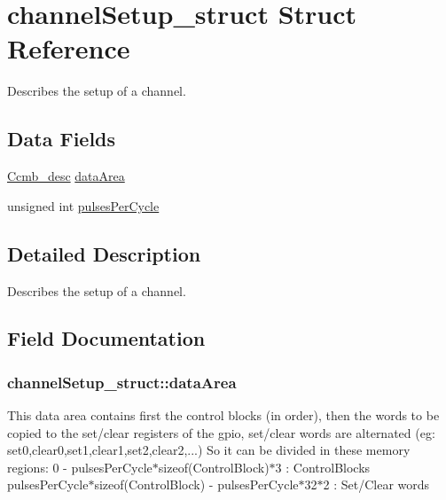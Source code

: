 \hypertarget{structchannelSetup__struct}{}\section{channel\+Setup\+\_\+struct Struct Reference}
\label{structchannelSetup__struct}


Describes the setup of a channel.  


\subsection*{Data Fields}
\begin{DoxyCompactItemize}
\item 
\hyperlink{cacheCoherentMemoryProvider_8h_a05057d32e6fd59ce23d78f2f88d68da2}{Ccmb\+\_\+desc} \hyperlink{structchannelSetup__struct_a07e1a7099e0c476f21dbea53574e1f52}{data\+Area}
\item 
unsigned int \hyperlink{structchannelSetup__struct_a20356f808e59b5e3a0678493fb71ddef}{pulses\+Per\+Cycle}
\end{DoxyCompactItemize}


\subsection{Detailed Description}
Describes the setup of a channel. 

\subsection{Field Documentation}
\subsubsection[{\texorpdfstring{data\+Area}{dataArea}}]{ channel\+Setup\+\_\+struct\+::data\+Area}\hypertarget{structchannelSetup__struct_a07e1a7099e0c476f21dbea53574e1f52}{}\label{structchannelSetup__struct_a07e1a7099e0c476f21dbea53574e1f52}
This data area contains first the control blocks (in order), then the words to be copied to the set/clear registers of the gpio, set/clear words are alternated (eg\+: set0,clear0,set1,clear1,set2,clear2,...) So it can be divided in these memory regions\+: 0 -\/ pulses\+Per\+Cycle$\ast$sizeof(Control\+Block)$\ast$3 \+: Control\+Blocks pulses\+Per\+Cycle$\ast$sizeof(Control\+Block) -\/ pulses\+Per\+Cycle$\ast$32$\ast$2 \+: Set/\+Clear words


